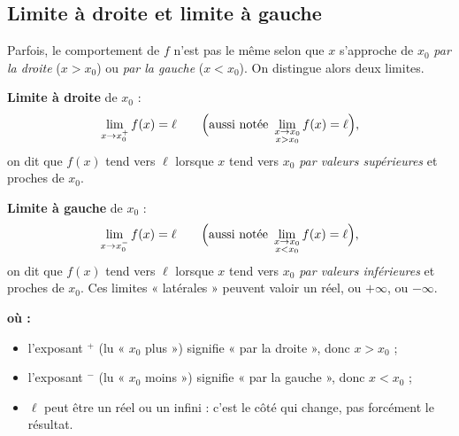 \documentclass[11pt,a4paper]{article}
\newenvironment{ou}{%
  \par\smallskip\noindent\textbf{où :}\nopagebreak
  \begin{itemize}[leftmargin=1.8em,topsep=2pt,itemsep=1.5pt,parsep=0pt]}%
  {\end{itemize}}
\begin{document}
\begin{center}
\end{center}

\subsection{Limite à droite et limite à gauche}

Parfois, le comportement de $f$ n'est pas le même selon que $x$ s'approche de $x_0$
\emph{par la droite} ($x>x_0$) ou \emph{par la gauche} ($x<x_0$). On distingue alors deux limites.

\begin{definition}
\textbf{Limite à droite} de $x_0$ :
\[ \lim_{x\to x_0^{+}} f(x)=\ell\qquad\Bigl(\text{aussi notée }\lim_{\substack{x\to x_0\\ x>x_0}} f(x)=\ell\Bigr), \]
on dit que $f(x)$ tend vers $\ell$ lorsque $x$ tend vers $x_0$ \emph{par valeurs supérieures} et
proches de $x_0$.

\textbf{Limite à gauche} de $x_0$ :
\[ \lim_{x\to x_0^{-}} f(x)=\ell\qquad\Bigl(\text{aussi notée }\lim_{\substack{x\to x_0\\ x<x_0}} f(x)=\ell\Bigr), \]
on dit que $f(x)$ tend vers $\ell$ lorsque $x$ tend vers $x_0$ \emph{par valeurs inférieures} et
proches de $x_0$. Ces limites « latérales » peuvent valoir un réel, ou $+\infty$, ou $-\infty$.
\end{definition}

\begin{ou}
  \item l'exposant $^{+}$ (lu « $x_0$ plus ») signifie « par la droite », donc $x>x_0$ ;
  \item l'exposant $^{-}$ (lu « $x_0$ moins ») signifie « par la gauche », donc $x<x_0$ ;
  \item $\ell$ peut être un réel ou un infini : c'est le côté qui change, pas forcément le résultat.
\end{ou}
\end{document}
